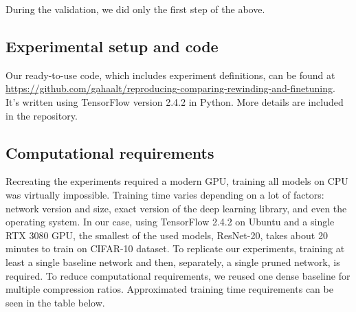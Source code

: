 During the validation, we did only the first step of the above.



\subsection{Experimental setup and code}


Our ready-to-use code, which includes experiment definitions, can be found at 
\url{https://github.com/gahaalt/reproducing-comparing-rewinding-and-finetuning}.
It's written using TensorFlow \cite{tensorflow} version 2.4.2 in Python. More details are included in the repository.

\subsection{Computational requirements}

Recreating the experiments required a modern GPU, training all models on CPU was virtually impossible. Training time varies depending on a lot of factors: network version and size, exact version of the deep learning library, and even the operating system. In our case, using TensorFlow 2.4.2 on Ubuntu and a single RTX 3080 GPU, the smallest of the used models, ResNet-20, takes about 20 minutes to train on CIFAR-10 dataset. To replicate our experiments, training at least a single baseline network and then, separately, a single pruned network, is required. To reduce computational requirements, we reused one dense baseline for multiple compression ratios. Approximated training time requirements can be seen in the table below.

